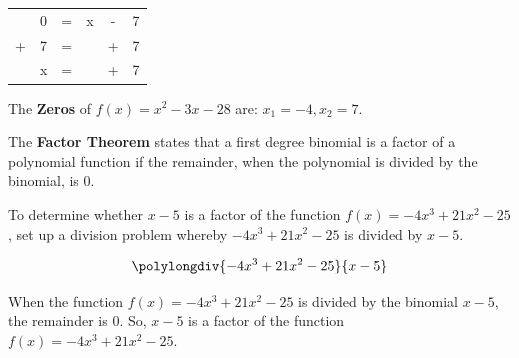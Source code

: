 \begin{theorem}
    \hfill
    \begin{minipage}[c]{0.5\textwidth}
        \centering
        \begin{tabular}{cccccc}
            & 0 & = & x & - & 7 \\
            + & 7 & = &   & + & 7 \\
            \hline
            & x & = & & + & 7 \\
        \end{tabular}
    \end{minipage}
    
    The \textbf{Zeros} of $f(x) = x^2 - 3x - 28$ are: $x_1 = -4, x_2 = 7$.
\end{theorem}

\begin{marginfigure}
    \centering
    \label{fig:fundamental-theorem-of-algebra}
\end{marginfigure}

\begin{theorem}
    The \textbf{Factor Theorem} states that a first degree binomial is a factor of a polynomial function if the remainder, when the polynomial is divided by the binomial, is $0$.

    To determine whether $x - 5$ is a factor of the function $f(x) = -4x^3 + 21x^2 - 25$, set up a division problem whereby $-4x^3 + 21x^2 - 25$ is divided by $x - 5$.
    
    \[ \polylongdiv{-4x^3 + 21x^2 - 25}{x - 5} \]

    When the function $f(x) = -4x^3 + 21x^2 - 25$ is divided by the binomial $x - 5$, the remainder is $0$. So, $x - 5$ is a factor of the function $f(x) = -4x^3 + 21x^2 - 25$.
\end{theorem}

